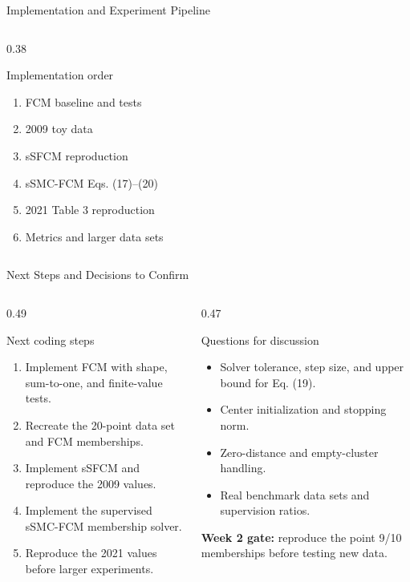 \documentclass[t,aspectratio=169]{beamer}
\begin{document}
\begin{frame}{Implementation and Experiment Pipeline}
\begin{columns}[T,onlytextwidth]
\begin{column}{0.38\textwidth}
\begin{block}{Implementation order}
        \begin{enumerate}
          \item FCM baseline and tests
          \item 2009 toy data
          \item sSFCM reproduction
          \item sSMC-FCM Eqs. (17)--(20)
          \item 2021 Table 3 reproduction
          \item Metrics and larger data sets
        \end{enumerate}
      \end{block}
    \end{column}
  \end{columns}
\end{frame}

\begin{frame}{Next Steps and Decisions to Confirm}
  \small
  \begin{columns}[T,onlytextwidth]
    \begin{column}{0.49\textwidth}
      \begin{block}{Next coding steps}
        \begin{enumerate}
          \item Implement FCM with shape, sum-to-one, and finite-value tests.
          \item Recreate the 20-point data set and FCM memberships.
          \item Implement sSFCM and reproduce the 2009 values.
          \item Implement the supervised sSMC-FCM membership solver.
          \item Reproduce the 2021 values before larger experiments.
        \end{enumerate}
      \end{block}
    \end{column}
    \begin{column}{0.47\textwidth}
      \begin{alertblock}{Questions for discussion}
        \begin{itemize}
          \item Solver tolerance, step size, and upper bound for Eq. (19).
          \item Center initialization and stopping norm.
          \item Zero-distance and empty-cluster handling.
          \item Real benchmark data sets and supervision ratios.
        \end{itemize}
      \end{alertblock}
      \textbf{Week 2 gate:} reproduce the point 9/10 memberships before testing new data.
    \end{column}
  \end{columns}

\end{frame}
\end{document}
